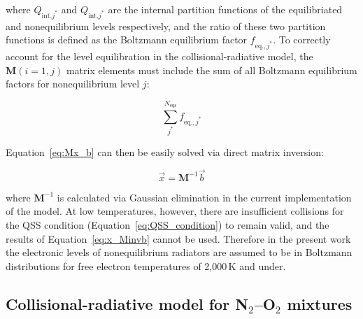 {\noindent where $Q_{\text{int,}{j^\ast}}$ and $Q_{\text{int,}{j^\ast}}$ are the internal partition functions of the equilibriated and nonequilibrium levels respectively, and the ratio of these two partition functions is defined as the Boltzmann equilibrium factor $f_{\text{eq.},j^\ast}$.
To correctly account for the level equilibration in the collisional-radiative model, the $\boldsymbol{M}(i=1,j)$ matrix elements must include the sum of all Boltzmann equilibrium factors for nonequilibrium level $j$:

\begin{equation}
 \sum_{j^\ast}^{N_{\text{eqs}}} f_{\text{eq.},j^\ast}
\end{equation}

\par

Equation~\ref{eq:Mx_b} can then be easily solved via direct matrix inversion:

\begin{equation}
 \vec{x} = \boldsymbol{M}^{-1} \vec{b} \label{eq:x_Minvb}
\end{equation}

\noindent where $\boldsymbol{M}^{-1}$ is calculated via Gaussian elimination in the current implementation of the model.
At low temperatures, however, there are insufficient collisions for the QSS condition (Equation~\ref{eq:QSS_condition}) to remain valid, and the results of Equation~\ref{eq:x_Minvb} cannot be used.
Therefore in the present work the electronic levels of nonequilibrium radiators are assumed to be in Boltzmann distributions for free electron temperatures of 2,000\,K and under. 

\subsection{Collisional-radiative model for N$_2$--O$_2$ mixtures}

}
